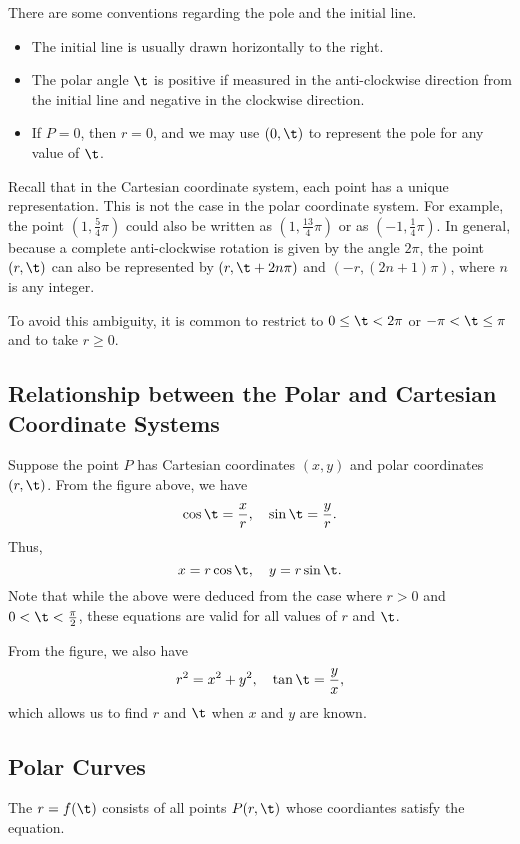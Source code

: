 There are some conventions regarding the pole and the initial line.
\begin{itemize}
    \item The initial line is usually drawn horizontally to the right.
    \item The polar angle $\t$ is positive if measured in the anti-clockwise direction from the initial line and negative in the clockwise direction.
    \item If $P = 0$, then $r = 0$, and we may use $(0, \t)$ to represent the pole for any value of $\t$.
\end{itemize}

Recall that in the Cartesian coordinate system, each point has a unique representation. This is not the case in the polar coordinate system. For example, the point $(1, \frac54 \pi)$ could also be written as $(1, \frac{13}{4} \pi)$ or as $(-1, \frac14 \pi)$. In general, because a complete anti-clockwise rotation is given by the angle $2\pi$, the point $(r, \t)$ can also be represented by $(r, \t + 2n\pi)$ and $(-r, (2n + 1)\pi)$, where $n$ is any integer.

To avoid this ambiguity, it is common to restrict to $0 \leq \t < 2\pi$ or $-\pi < \t \leq \pi$ and to take $r \geq 0$.

\subsection{Relationship between the Polar and Cartesian Coordinate Systems}

Suppose the point $P$ has Cartesian coordinates $(x, y)$ and polar coordinates $(r, \t)$. From the figure above, we have \[\cos \t = \frac{x}{r}, \quad \sin \t = \frac{y}{r}.\] Thus, \[x = r\cos \t, \quad y = r\sin\t.\] Note that while the above were deduced from the case where $r > 0$ and $0 < \t < \frac\pi2$, these equations are valid for all values of $r$ and $\t$.

From the figure, we also have \[r^2 = x^2 + y^2, \quad \tan \t = \frac{y}{x},\] which allows us to find $r$ and $\t$ when $x$ and $y$ are known.

\subsection{Polar Curves}

\begin{definition}
    The  $r = f(\t)$ consists of all points $P(r, \t)$ whose coordiantes satisfy the equation.
\end{definition}

